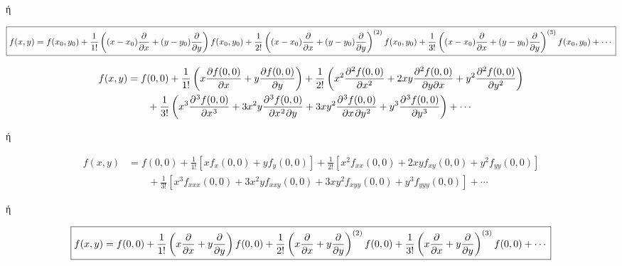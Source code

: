 \documentclass[a4paper,landscape]{article}
\begin{document}
     \begin{center}
       ή 
     \end{center}

     \begin{equation*}
       \boxed{f(x,y)=f(x_{0}, y_{0}) + \frac{1}{1!} \left((x- x_{0})
         \pdv{x}+ (y- y_{0})\pdv{y}\right) f(x_{0}, y_{0})
         + \frac{1}{2!} \left((x- x_{0})
         \pdv{x}+ (y- y_{0})\pdv{y}\right)^{(2)}f(x_{0}, y_{0} ) 
         + \frac{1}{3!} \left((x- x_{0})
       \pdv{x}+ (y- y_{0})\pdv{y}\right)^{(3)}f(x_{0}, y_{0}) + \cdots}
     \end{equation*}


     \vspace{2\baselineskip}


     \begin{center}
       \minibox{\textcolor{Col1}{\large\bfseries Τύπος Maclaurin}}
     \end{center}

     \begin{align*}
       f(x,y)&=f(0,0) + \frac{1}{1!} \left(x \pdv{f(0,0)}{x} + y \pdv{f(0,0)}{y} \right)
       + \frac{1}{2!} \left(x^{2} \pdv[2]{f(0,0)}{x} + 2xy \pdv[2]{f(0,0)}{y}{x} + y^{2} 
       \pdv[2]{f(0,0)}{y} \right) \\
             & \qquad + \frac{1}{3!} \left(x^{3} \diffp[3]{f(0,0)}{x} + 3 x^{2}y
               \diffp[2,1]{f(0,0)}{x,y} 
               + 3 xy^{2} \diffp[1,2]{f(0,0)}{x,y} + y^{3}
             \diffp[3]{f(0,0)}{y} \right) + \cdots
     \end{align*}

     \begin{center}
       ή
     \end{center}

     \begin{align*}
       f(x,y)&=f(0,0) + \frac{1}{1!} \left[x f_{x}(0,0)  + y f_{y}(0,0)\right]
       + \frac{1}{2!} \left[x^{2} f_{xx}(0,0)+ 2xy f_{xy}(0,0) + y^{2} f_{yy}(0,0)\right] \\
             & \qquad + \frac{1}{3!} \left[ x^{3} f_{xxx}(0,0)
               + 3 x^{2}y f_{xxy}(0,0) + 3 xy^{2} f_{xyy}(0,0) + y^{3} f_{yyy} (0,0)
             \right] + \cdots
     \end{align*} 

     \begin{center}
       ή
     \end{center}

     \begin{equation*}
       \boxed{f(x,y)=f(0,0) + \frac{1}{1!} \left(x \pdv{x}+ y\pdv{y}\right) f(0,0)
         + \frac{1}{2!} \left(x \pdv{x}+ y\pdv{y}\right)^{(2)}f(0,0) 
       + \frac{1}{3!} \left(x \pdv{x}+ y\pdv{y}\right)^{(3)}f(0,0) + \cdots}
     \end{equation*}

     
\end{document}
